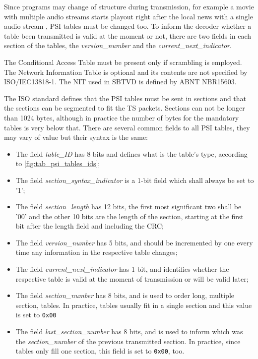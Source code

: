 \documentclass[
	12pt,				%
	openright,			%
	twoside,			%
	a4paper,			%
	brazil,
	french,				%
	english
	]{abntex2}
\begin{document}
Since programs may change of structure during transmission, for example a movie with multiple audio streams starts playout right after the local news with a single audio stream , PSI tables must be changed too. To inform the decoder whether a table been transmitted is valid at the moment or not, there are two fields in each section of the tables, the \textit{version\_number} and the \textit{current\_next\_indicator}.

The Conditional Access Table must be present only if scrambling is employed. The Network Information Table is optional and its contents are not specified by ISO/IEC13818-1. The NIT used in SBTVD is defined by ABNT NBR15603.

The ISO standard defines that the PSI tables must be sent in sections and that the sections can be segmented to fit the TS packets. Sections can not be longer than 1024 bytes, although in practice the number of bytes for the mandatory tables is very below that. There are several common fields to all PSI tables, they may vary of value but their syntax is the same:
\begin{itemize}
\item{The field \textit{table\_ID} has 8 bits and defines what is the table's type, according to \autoref{fig:tab_psi_tables_ids};}
\item{The field \textit{section\_syntax\_indicator} is a 1-bit field which shall always be set to '1';}
\item{The field \textit{section\_length} has 12 bits, the first most significant two shall be '00' and the other 10 bits are the length of the section, starting at the first bit after the length field and including the CRC;}
\item{The field \textit{version\_number} has 5 bits, and should be incremented by one every time any information in the respective table changes;}
\item{The field \textit{current\_next\_indicator} has 1 bit, and identifies whether the respective table is valid at the moment of transmission or will be valid later;}
\item{The field \textit{section\_number} has 8 bits, and is used to order long, multiple section, tables. In practice, tables usually fit in a single section and this value is set to \texttt{0x00}}
\item{The field \textit{last\_section\_number} has 8 bits, and is used to inform which was the \textit{section\_number} of the previous transmitted section. In practice, since tables only fill one section, this field is set to \texttt{0x00}, too.}
\end{itemize}
\end{document}
